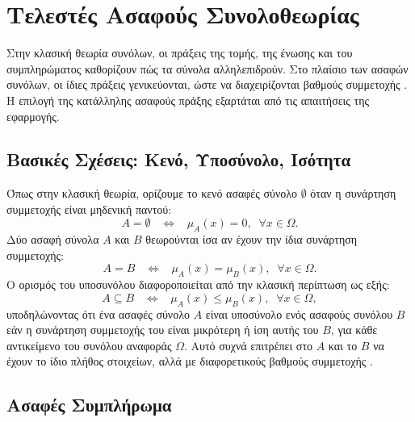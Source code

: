 \section{Τελεστές Ασαφούς Συνολοθεωρίας}

Στην κλασική θεωρία συνόλων, οι πράξεις της τομής, της ένωσης και του συμπληρώματος καθορίζουν πώς τα σύνολα αλληλεπιδρούν. Στο πλαίσιο των ασαφών συνόλων, οι ίδιες πράξεις γενικεύονται, ώστε να διαχειρίζονται βαθμούς συμμετοχής \cite{Zadeh1965,KlirYuan}. Η επιλογή της κατάλληλης ασαφούς πράξης εξαρτάται από τις απαιτήσεις της εφαρμογής.  

\subsection{Βασικές Σχέσεις: Κενό, Υποσύνολο, Ισότητα}

Όπως στην κλασική θεωρία, ορίζουμε το κενό ασαφές σύνολο \(\emptyset\) όταν η συνάρτηση συμμετοχής είναι μηδενική παντού:
\begin{equation}
    A = \emptyset \;\;\; \Longleftrightarrow \;\;\; \mu_{A}(x) = 0, \;\; \forall x\in \Omega.
\end{equation}
Δύο ασαφή σύνολα \(A\) και \(B\) θεωρούνται ίσα αν έχουν την ίδια συνάρτηση συμμετοχής:
\begin{equation}
    A = B \;\;\; \Longleftrightarrow \;\;\; \mu_{A}(x) = \mu_{B}(x), \;\; \forall x \in \Omega.
\end{equation}
Ο ορισμός του υποσυνόλου διαφοροποιείται από την κλασική περίπτωση ως εξής:
\begin{equation}
    A \subseteq B \;\;\; \Longleftrightarrow \;\;\; \mu_{A}(x) \leq \mu_{B}(x), \;\; \forall x \in \Omega,
\end{equation}
υποδηλώνοντας ότι ένα ασαφές σύνολο \(A\) είναι υποσύνολο ενός ασαφούς συνόλου \(B\) εάν η συνάρτηση συμμετοχής του είναι μικρότερη ή ίση αυτής του \(B\), για κάθε αντικείμενο του συνόλου αναφοράς \(\Omega\). Αυτό συχνά επιτρέπει στο \(A\) και το \(B\) να έχουν το ίδιο πλήθος στοιχείων, αλλά με διαφορετικούς βαθμούς συμμετοχής \cite{DuboisPrade1980}.

\subsection{Ασαφές Συμπλήρωμα}

